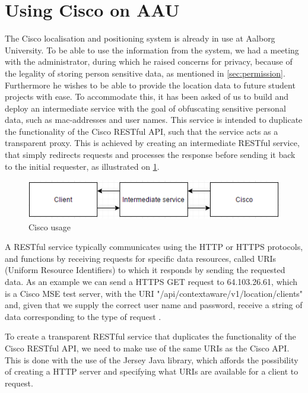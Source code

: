 \section{Using Cisco on AAU}
The Cisco localisation and positioning system is already in use at Aalborg University. To be able to use the information from the system, we had a meeting with the administrator, during which he raised concerns for privacy, because of the legality of storing person sensitive data, as mentioned in \cref{sec:permission}. Furthermore he wishes to be able to provide the location data to future student projects with ease. To accommodate this, it has been asked of us to build and deploy an intermediate service with the goal of obfuscating sensitive personal data, such as mac-addresses and user names. This service is intended to duplicate the functionality of the Cisco RESTful API, such that the service acts as a transparent proxy. This is achieved by creating an intermediate RESTful service, that simply redirects requests and processes the response before sending it back to the initial requester, as illustrated on \cref{fig:cisco_usage}.

\begin{figure}[ht]
	\begin{center}
	\includegraphics[scale=0.9]{graphics/cisco_usage.png}
	\caption{Cisco usage}
	\label{fig:cisco_usage}
	\end{center} 
\end{figure}

A RESTful service typically communicates using the HTTP or HTTPS protocols, and functions by receiving requests for specific data resources, called URIs (Uniform Resource Identifiers) to which it responds by sending the requested data. As an example we can send a HTTPS GET request to 64.103.26.61, which is a Cisco MSE test server, with the URI "/api/contextaware/v1/location/clients" and, given that we supply the correct user name and password, receive a string of data corresponding to the type of request \cite{restful_oracle}.

To create a transparent RESTful service that duplicates the functionality of the Cisco RESTful API, we need to make use of the same URIs as the Cisco API\cite{cisco_mse_api}. This is done with the use of the Jersey Java library, which affords the possibility of creating a HTTP server and specifying what URIs are available for a client to request.


